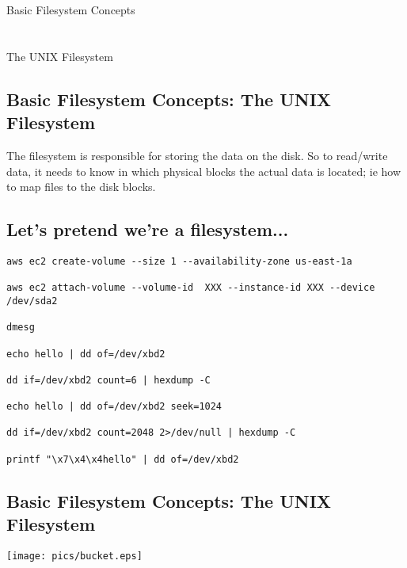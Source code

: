 \documentclass[xga]{xdvislides}
\begin{document}
\newpage
\vspace*{\fill}
\begin{center}
	\Hugesize
		Basic Filesystem Concepts\\ [1em]
	\hspace*{5mm}
	\blueline\\
	\hspace*{5mm}\\
		The UNIX Filesystem
\end{center}
\vspace*{\fill}

\subsection{Basic Filesystem Concepts: The UNIX Filesystem}
The filesystem is responsible for storing the data on the disk.
So to read/write data, it needs to know in which physical blocks the actual
data is located; ie how to map files to the disk blocks.

\subsection{Let's pretend we're a filesystem...}

\begin{verbatim}
aws ec2 create-volume --size 1 --availability-zone us-east-1a

aws ec2 attach-volume --volume-id  XXX --instance-id XXX --device /dev/sda2

dmesg

echo hello | dd of=/dev/xbd2

dd if=/dev/xbd2 count=6 | hexdump -C

echo hello | dd of=/dev/xbd2 seek=1024

dd if=/dev/xbd2 count=2048 2>/dev/null | hexdump -C

printf "\x7\x4\x4hello" | dd of=/dev/xbd2
\end{verbatim}




\subsection{Basic Filesystem Concepts: The UNIX Filesystem}
\vspace*{\fill}
\begin{center}
\texttt{[image: pics/bucket.eps]} \\
\end{center}
\vspace*{\fill}
\end{document}
